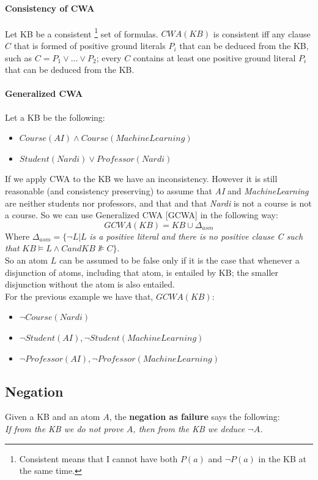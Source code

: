 \documentclass[10pt,a4paper]{article}
\begin{document}
\begin{itemize}
\paragraph{Consistency of CWA}
Let KB be a consistent \footnote{Consistent means that I cannot have both $P(a)$ and $\neg P(a)$ in the KB at the same time.} set of formulas. $CWA(KB)$ is consistent iff any clause $C$ that
is formed of positive ground literals $P_i$ that can be deduced from the KB, such as $C=P_1\vee...\vee P_2$; every $C$ contains at least one positive ground literal $P_i$ that can be deduced from the KB.


\paragraph{Generalized CWA}
Let a KB be the following:
\begin{itemize}
\item $Course(AI) \wedge Course(MachineLearning)$
\item $Student(Nardi) \vee Professor(Nardi)$
\end{itemize}
If we apply CWA to the KB we have an inconsistency. However it is still reasonable (and consistency preserving) to assume that \textit{AI} and \textit{MachineLearning} are neither students nor professors, 
and that and that \textit{Nardi} is not a course is not a course. So we can use Generalized CWA [GCWA] in the following way:
\[GCWA(KB)=KB\cup \Delta_{asm}\]
Where $\Delta_{asm}= \lbrace \neg L | L$ \textit{is a positive literal and there is no positive clause C
such that} $KB \models L\wedge C and KB \nVDash C \rbrace$.\\
So an atom $L$ can be assumed to be false only if it is the case that whenever a disjunction of atoms, including that atom, is entailed by KB; the smaller disjunction without the atom is also entailed.\\
For the previous example we have that, $GCWA(KB)$:
\begin{itemize}
\item $\neg Course(Nardi)$
\item $\neg Student(AI), \neg Student(MachineLearning)$
\item $\neg Professor(AI), \neg Professor(MachineLearning)$
\end{itemize}

\subsection{Negation}
Given a KB and an atom $A$, the \textbf{negation as failure} says the following:\\
\textit{If from the KB we do not prove $A$, then from the KB we deduce $\neg A$.}\\



\end{itemize}
\end{document}
